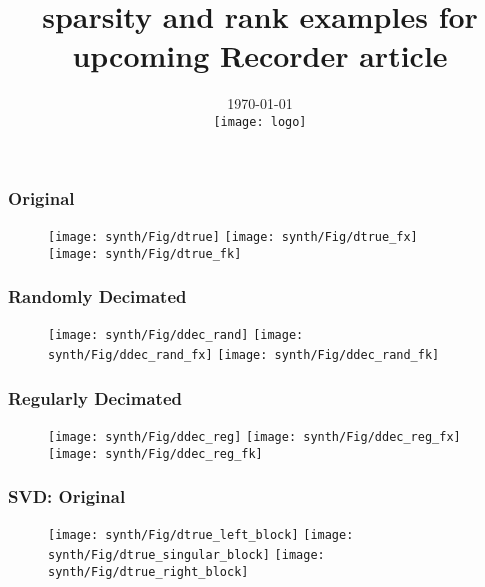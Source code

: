 \title[Short title]{sparsity and rank examples for upcoming Recorder article}
\author{ }
\institute{ }
\date{\today \\ \vspace{3cm}   \texttt{[image: logo]}}


\maketitle


\begin{frame} \frametitle{Original}
    \begin{figure}[ht]
    \centering
    \texttt{[image: synth/Fig/dtrue]}\quad
    \texttt{[image: synth/Fig/dtrue\_fx]}\quad
    \texttt{[image: synth/Fig/dtrue\_fk]}
    \end{figure}
\end{frame}

\begin{frame} \frametitle{Randomly Decimated}
    \begin{figure}[ht]
    \centering
    \texttt{[image: synth/Fig/ddec\_rand]}\quad
    \texttt{[image: synth/Fig/ddec\_rand\_fx]}\quad
    \texttt{[image: synth/Fig/ddec\_rand\_fk]}
    \end{figure}
\end{frame}

\begin{frame} \frametitle{Regularly Decimated}
    \begin{figure}[ht]
    \centering
    \texttt{[image: synth/Fig/ddec\_reg]}\quad
    \texttt{[image: synth/Fig/ddec\_reg\_fx]}\quad
    \texttt{[image: synth/Fig/ddec\_reg\_fk]}
    \end{figure}
\end{frame}

\begin{frame} \frametitle{SVD: Original}
    \begin{figure}[ht]
    \centering
    \texttt{[image: synth/Fig/dtrue\_left\_block]}\quad
    \texttt{[image: synth/Fig/dtrue\_singular\_block]}\quad
    \texttt{[image: synth/Fig/dtrue\_right\_block]}
    \end{figure}
\end{frame}

